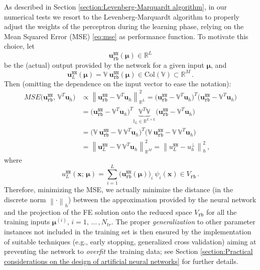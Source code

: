 \documentclass[12pt, a4paper, twoside, openright]{report}
\numberwithin{equation}{chapter}
\theoremstyle{theorem}
\theoremstyle{definition}
\theoremstyle{remark}
\theoremstyle{proposition}
\numberwithin{figure}{chapter}
\newcommand{\norm}[1]{\left\lVert#1\right\rVert}
\newcommand{\bg}[1]{\boldsymbol{#1}}
\begin{document}
		As described in Section \ref{section:Levenberg-Marquardt algorithm}, in our numerical tests we resort to the Levenberg-Marquardt algorithm to properly adjust the weights of the perceptron during the learning phase, relying on the Mean Squared Error (MSE) \eqref{eq:mse} as performance function. To motivate this choice, let 
		\begin{equation*}
			\mathbf{u}_{\texttt{rb}}^{\texttt{NN}}(\bg{\mu}) \in \mathbb{R}^L
		\end{equation*}
		be the (actual) output provided by the network for a given input $\bg{\mu}$, and 
		\begin{equation*}
			\mathbf{u}_L^{\texttt{NN}}(\bg{\mu}) = \mathbb{V} ~ \mathbf{u}_{\texttt{rb}}^{\texttt{NN}}(\bg{\mu}) \in \text{Col}(\mathbb{V}) \subset \mathbb{R}^M \, . 
		\end{equation*}
		Then (omitting the dependence on the input vector to ease the notation):
		\begin{equation}
			\label{eq:pod-nn-mse}
			\begin{aligned}
				MSE \big( \mathbf{u}_{\texttt{rb}}^{\texttt{NN}}, \, \mathbb{V}^T \mathbf{u}_h \big) & \propto \norm{\mathbf{u}_{\texttt{rb}}^{\texttt{NN}} - \mathbb{V}^T \mathbf{u}_h}^2_{\mathbb{R}^L} = \big( \mathbf{u}_{\texttt{rb}}^{\texttt{NN}} - \mathbb{V}^T \mathbf{u}_h \big)^T \big( \mathbf{u}_{\texttt{rb}}^{\texttt{NN}} - \mathbb{V}^T \mathbf{u}_h \big) \\
				& = \big( \mathbf{u}_{\texttt{rb}}^{\texttt{NN}} - \mathbb{V}^T \mathbf{u}_h \big)^T \underbrace{\mathbb{V}^T \mathbb{V}}_{\mathbb{I}_L \in \mathbb{R}^{L \times L}} \big( \mathbf{u}_{\texttt{rb}}^{\texttt{NN}} - \mathbb{V}^T \mathbf{u}_h \big) \\
				& = \big( \mathbb{V} ~ \mathbf{u}_{\texttt{rb}}^{\texttt{NN}} - \mathbb{V} ~ \mathbb{V}^T \mathbf{u}_h \big)^T \big( \mathbb{V} ~ \mathbf{u}_{\texttt{rb}}^{\texttt{NN}} - \mathbb{V} ~ \mathbb{V}^T \mathbf{u}_h \big) \\
				& = \norm{\mathbf{u}_L^{\texttt{NN}} - \mathbb{V} ~ \mathbb{V}^T \mathbf{u}_h}^2_{\mathbb{R}^M} = \norm{u_L^{\texttt{NN}} - u_h^{\perp}}^2_h \, ,
			\end{aligned}
		\end{equation} 
		where
		\begin{equation}
			\label{eq:pod-nn-solution}
			u_L^{\texttt{NN}}(\bg{x}; \, \bg{\mu}) = \sum_{i = 1}^L \big( \mathbf{u}_{\texttt{rb}}^{\texttt{NN}}(\bg{\mu}) \big)_i ~ \psi_i(\bg{x}) \in V_{\texttt{rb}} \, .
		\end{equation}
		Therefore, minimizing the MSE, we actually minimize the distance (in the discrete norm $\norm{\cdot}_h$) between the approximation provided by the neural network and the projection of the FE solution onto the reduced space $V_{\texttt{rb}}$ for all the training inputs $\bg{\mu}^{(i)}$, $i = 1, \, \ldots \, , N_{tr}$. The proper \emph{generalization} to other parameter instances not included in the training set is then ensured by the implementation of suitable techniques (e.g., early stopping, generalized cross validation) aiming at preventing the network to \emph{overfit} the training data; see Section \ref{section:Practical considerations on the design of artificial neural networks} for further details.
		
\end{document}
